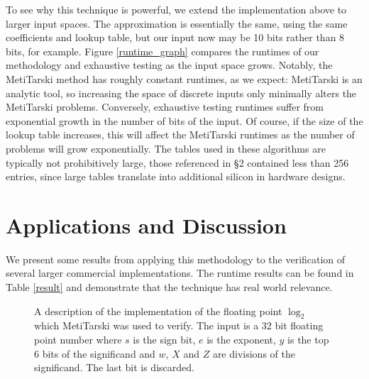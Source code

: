 \documentclass{fac}
\begin{document}
To see why this technique is powerful, we extend the implementation above to larger input spaces. The approximation is essentially the same, using the same coefficients and lookup table, but our input now may be 10 bits rather than 8 bits, for example. Figure \ref{runtime_graph} compares the runtimes of our methodology and exhaustive testing as the input space grows. Notably, the MetiTarski method has roughly constant runtimes, as we expect: MetiTarski is an analytic tool, so increasing the space of discrete inputs only minimally alters the MetiTarski problems. Conversely, exhaustive testing runtimes suffer from exponential growth in the number of bits of the input. Of course, if the size of the lookup table increases, this will affect the MetiTarski runtimes as the number of problems will grow exponentially. The tables used in these algorithms are typically not prohibitively large, those referenced in \S 2 contained less than 256 entries, since large tables translate into additional silicon in hardware designs.


\section{Applications and Discussion}
\label{Apps}
We present some results from applying this methodology to the verification of several larger commercial implementations. The runtime results can be found in Table \ref{result} and demonstrate that the technique has real world relevance.

\begin{figure}
\centering

\caption{A description of the implementation of the floating point $\log_2$ which MetiTarski was used to verify. The input is a 32 bit floating point number where $s$ is the sign bit, $e$ is the exponent, $y$ is the top 6 bits of the significand and $w$, $X$ and $Z$ are divisions of the significand. The last bit is discarded.\label{block_diagram}}
\end{figure}
\end{document}
